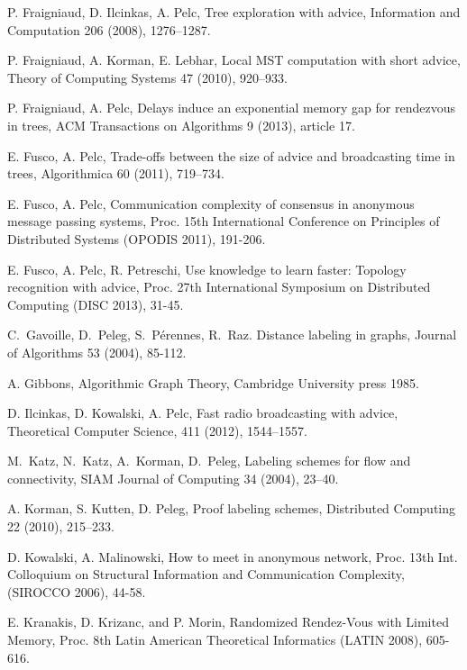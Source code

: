 \documentclass{llncs}
\begin{document}
\begin{thebibliography}{12}
P. Fraigniaud, D. Ilcinkas, A. Pelc, 
Tree exploration with advice, Information and Computation 206 (2008), 1276--1287.


P. Fraigniaud, A. Korman, E. Lebhar,
Local MST computation with short advice,
Theory of Computing Systems 47 (2010), 920--933.

P. Fraigniaud, A. Pelc, Delays induce an exponential memory gap for rendezvous in trees, ACM Transactions on Algorithms 9 (2013), article 17. 




E. Fusco, A. Pelc, Trade-offs between the size of advice and broadcasting time in trees, Algorithmica 60 (2011), 719--734. 

E. Fusco, A. Pelc, Communication complexity of consensus in anonymous message passing systems, Proc. 15th International Conference on Principles of Distributed Systems (OPODIS 2011), 191-206. 

E. Fusco, A. Pelc, R. Petreschi, Use knowledge to learn faster: Topology recognition with advice, Proc. 27th International Symposium on Distributed Computing (DISC 2013), 31-45.

C.~Gavoille, D.~Peleg, S.~P\'{e}rennes, R.~Raz.
Distance labeling in graphs, 
Journal of Algorithms 53 (2004), 85-112.

A. Gibbons, Algorithmic Graph Theory, Cambridge University press 1985.






D. Ilcinkas, D. Kowalski, A. Pelc, 
Fast radio broadcasting with advice, 
 Theoretical Computer Science, 411 (2012),  1544--1557.

M.~Katz, N.~Katz, A.~Korman, D.~Peleg, Labeling schemes for flow and
connectivity, 
SIAM Journal of  Computing 34 (2004), 23--40.



A. Korman, S. Kutten, D. Peleg, Proof labeling schemes,
Distributed Computing 22 (2010), 215--233.  




D. Kowalski, A. Malinowski,
How to meet in anonymous network,
Proc. 13th Int. Colloquium on Structural Information and Communication Complexity,
(SIROCCO 2006), 44-58. 

E. Kranakis, D. Krizanc, and P. Morin, 
Randomized Rendez-Vous with Limited Memory,
Proc. 8th Latin American Theoretical Informatics (LATIN 2008), 605-616.


\end{thebibliography}
\end{document}
